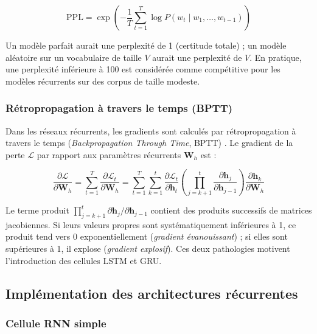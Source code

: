 \documentclass[11pt,a4paper]{article}
\begin{document}
\begin{equation}
  \mathrm{PPL} = \exp\!\left(-\frac{1}{T} \sum_{t=1}^{T} \log P(w_t \mid w_1, \ldots, w_{t-1})\right)
  \label{eq:perplexity}
\end{equation}

Un modèle parfait aurait une perplexité de 1 (certitude totale) ; un modèle aléatoire
sur un vocabulaire de taille $V$ aurait une perplexité de $V$. En pratique, une
perplexité inférieure à 100 est considérée comme compétitive pour les modèles récurrents
sur des corpus de taille modeste.

\subsubsection{Rétropropagation à travers le temps (BPTT)}

Dans les réseaux récurrents, les gradients sont calculés par rétropropagation à travers
le temps (\textit{Backpropagation Through Time}, BPTT) \cite{werbos1990backpropagation}.
Le gradient de la perte $\mathcal{L}$ par rapport aux paramètres récurrents $\mathbf{W}_h$
est :

\begin{equation}
  \frac{\partial \mathcal{L}}{\partial \mathbf{W}_h} =
  \sum_{t=1}^{T} \frac{\partial \mathcal{L}_t}{\partial \mathbf{W}_h}
  = \sum_{t=1}^{T} \sum_{k=1}^{t}
    \frac{\partial \mathcal{L}_t}{\partial \mathbf{h}_t}
    \left(\prod_{j=k+1}^{t} \frac{\partial \mathbf{h}_j}{\partial \mathbf{h}_{j-1}}\right)
    \frac{\partial \mathbf{h}_k}{\partial \mathbf{W}_h}
  \label{eq:bptt}
\end{equation}

Le terme produit $\prod_{j=k+1}^{t} \partial \mathbf{h}_j / \partial \mathbf{h}_{j-1}$
contient des produits successifs de matrices jacobiennes. Si leurs valeurs propres sont
systématiquement inférieures à 1, ce produit tend vers 0 exponentiellement
(\textit{gradient évanouissant}) ; si elles sont supérieures à 1, il explose
(\textit{gradient explosif}). Ces deux pathologies motivent l'introduction des cellules
LSTM et GRU.

\subsection{Implémentation des architectures récurrentes}

\subsubsection{Cellule RNN simple}
\end{document}
